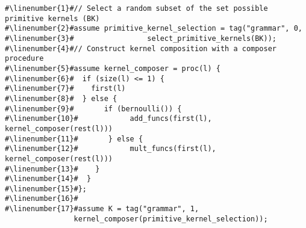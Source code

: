 \begin{mdframed}
\begin{minipage}{\linewidth}
\small
\belowcaptionskip=-10pt
\begin{lstlisting}[mathescape,label=alg:grammar,basicstyle=\selectfont\ttfamily,numbers=none,caption={
Stochastic Grammar},escapechar=\#]
#\linenumber{1}#// Select a random subset of the set possible primitive kernels (BK)
#\linenumber{2}#assume primitive_kernel_selection = tag("grammar", 0,
#\linenumber{3}#				 select_primitive_kernels(BK));
#\linenumber{4}#// Construct kernel composition with a composer procedure
#\linenumber{5}#assume kernel_composer = proc(l) {
#\linenumber{6}#  if (size(l) <= 1) {
#\linenumber{7}#    first(l)
#\linenumber{8}#  } else {
#\linenumber{9}#       if (bernoulli()) {
#\linenumber{10}#            add_funcs(first(l),  kernel_composer(rest(l)))
#\linenumber{11}#       } else {
#\linenumber{12}#            mult_funcs(first(l), kernel_composer(rest(l)))
#\linenumber{13}#    }
#\linenumber{14}#  }
#\linenumber{15}#};
#\linenumber{16}#
#\linenumber{17}#assume K = tag("grammar", 1,
	        	kernel_composer(primitive_kernel_selection));
\end{lstlisting}

\end{minipage}
\end{mdframed}
